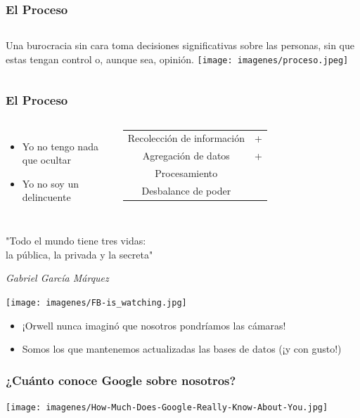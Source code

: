 \documentclass{beamer}
\begin{document}
\begin{frame}
  \frametitle{El Proceso}
  \begin{columns}
    Una burocracia sin cara toma decisiones significativas sobre las personas, sin que estas tengan control o, aunque sea, opinión.
    \texttt{[image: imagenes/proceso.jpeg]}
  \end{columns}
\end{frame}

\begin{frame}
  \frametitle{El Proceso}
  \begin{columns}
  \begin{itemize}
  \item Yo no tengo nada que ocultar
  \item Yo no soy un delincuente \pause
    \end{itemize}
      \begin{tabular}{cc}
         Recolección de información & + \\
         Agregación de datos & + \\
         Procesamiento  \\
         \hline
         Desbalance de poder
    \end{tabular}
    \end{columns}
    \pause
    \begin{block}{ }
    \begin{center}
      "Todo el mundo tiene tres vidas: \\ la pública, la privada y la secreta"
  \end{center}
     \textit{Gabriel García Márquez}
     \end{block}
 \end{frame}

\begin{frame}
  \texttt{[image: imagenes/FB-is\_watching.jpg]}
  \begin{itemize}
  \item ¡Orwell nunca imaginó que nosotros pondríamos las cámaras!
  \item  Somos los que mantenemos actualizadas las bases de datos (¡y con gusto!)
  \end{itemize}
\end{frame}

\begin{frame}
  \frametitle{¿Cuánto conoce Google sobre nosotros?}
  \texttt{[image: imagenes/How-Much-Does-Google-Really-Know-About-You.jpg]}
\end{frame}
\end{document}
